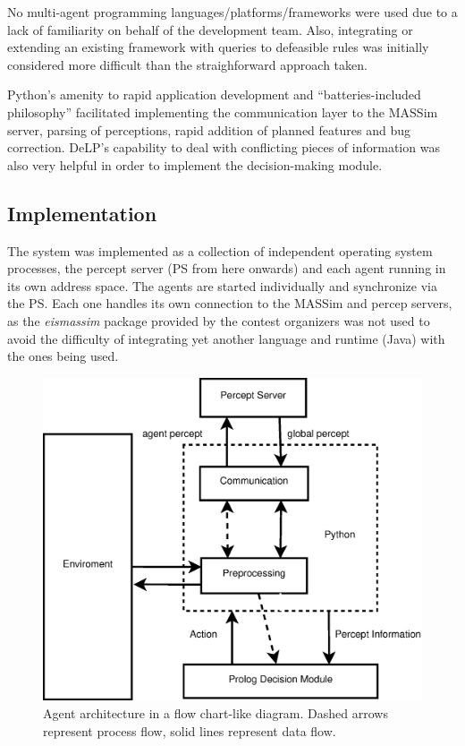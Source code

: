     No multi-agent programming languages/platforms/frameworks were used due to 
    a lack of familiarity on behalf of the development team. 
    Also, integrating or extending an existing framework with queries to
    defeasible rules was initially considered more difficult than the
    straighforward approach taken.

    Python's amenity to rapid application development and ``batteries-included 
    philosophy'' facilitated implementing the communication layer to the MASSim 
    server, parsing of perceptions, rapid addition of planned features and bug 
    correction. DeLP's capability to deal with conflicting pieces of
    information was also very helpful in order to implement the
    decision-making module. 

\subsection{Implementation}
    The system was implemented as a collection of independent operating system
    processes, the percept server (PS from here onwards) and each agent running
    in its own address space.  The agents are started individually and
    synchronize via the PS.  Each one handles its own connection to
    the MASSim and percep servers, as the \textit{eismassim} package provided
    by the contest organizers was not used to avoid the difficulty of
    integrating yet another language and runtime (Java) with the ones being
    used. 
    
    \begin{figure}
    \centering
    \includegraphics[scale=.3]{agentarchitecture.eps}
    \caption{Agent architecture in a flow chart-like diagram. Dashed arrows
    represent process flow, solid lines represent data flow.}
    \label{fig:architecture}
    \end{figure}

